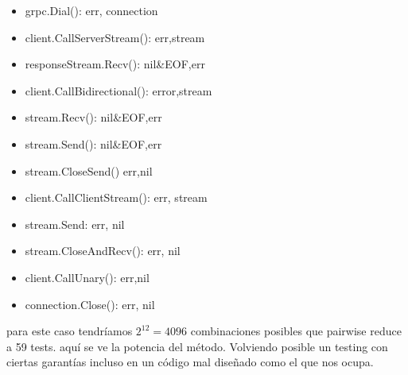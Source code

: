 \begin{itemize}
    \item grpc.Dial(): err, connection
    \item client.CallServerStream(): err,stream
    \item responseStream.Recv(): nil\&EOF,err
    \item client.CallBidirectional(): error,stream
    \item stream.Recv(): nil\&EOF,err
    \item stream.Send(): nil\&EOF,err
    \item stream.CloseSend() err,nil
    \item client.CallClientStream(): err, stream
    \item stream.Send: err, nil
    \item stream.CloseAndRecv(): err, nil
    \item client.CallUnary(): err,nil
    \item connection.Close(): err, nil
\end{itemize}

para este caso tendríamos $ 2^{12} = 4096 $ combinaciones posibles que pairwise reduce a 59 tests. aquí se ve la potencia del método. Volviendo posible un testing con ciertas garantías incluso en un código mal diseñado como el que nos ocupa.
